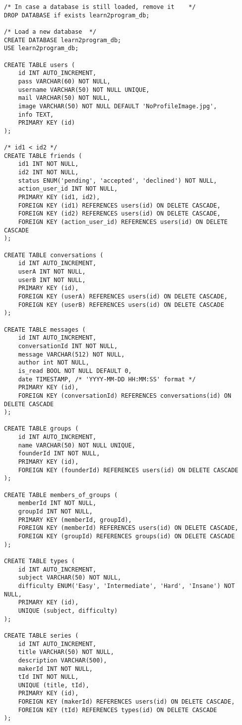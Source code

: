 \begin{lstlisting}    
/* In case a database is still loaded, remove it    */
DROP DATABASE if exists learn2program_db;

/* Load a new database  */
CREATE DATABASE learn2program_db;
USE learn2program_db;

CREATE TABLE users (
    id INT AUTO_INCREMENT,
    pass VARCHAR(60) NOT NULL,
    username VARCHAR(50) NOT NULL UNIQUE,
    mail VARCHAR(50) NOT NULL,
    image VARCHAR(50) NOT NULL DEFAULT 'NoProfileImage.jpg', 
    info TEXT,
    PRIMARY KEY (id)
);

/* id1 < id2 */
CREATE TABLE friends (
    id1 INT NOT NULL,
    id2 INT NOT NULL,
    status ENUM('pending', 'accepted', 'declined') NOT NULL,
    action_user_id INT NOT NULL,
    PRIMARY KEY (id1, id2),
    FOREIGN KEY (id1) REFERENCES users(id) ON DELETE CASCADE,
    FOREIGN KEY (id2) REFERENCES users(id) ON DELETE CASCADE,
    FOREIGN KEY (action_user_id) REFERENCES users(id) ON DELETE CASCADE
);

CREATE TABLE conversations (
    id INT AUTO_INCREMENT,
    userA INT NOT NULL,
    userB INT NOT NULL,
    PRIMARY KEY (id),
    FOREIGN KEY (userA) REFERENCES users(id) ON DELETE CASCADE,
    FOREIGN KEY (userB) REFERENCES users(id) ON DELETE CASCADE
);

CREATE TABLE messages (
    id INT AUTO_INCREMENT,
    conversationId INT NOT NULL,
    message VARCHAR(512) NOT NULL,
    author int NOT NULL,
    is_read BOOL NOT NULL DEFAULT 0,
    date TIMESTAMP, /* 'YYYY-MM-DD HH:MM:SS' format */
    PRIMARY KEY (id),
    FOREIGN KEY (conversationId) REFERENCES conversations(id) ON DELETE CASCADE
);

CREATE TABLE groups (
    id INT AUTO_INCREMENT,
    name VARCHAR(50) NOT NULL UNIQUE,
    founderId INT NOT NULL,
    PRIMARY KEY (id),
    FOREIGN KEY (founderId) REFERENCES users(id) ON DELETE CASCADE
);

CREATE TABLE members_of_groups (
    memberId INT NOT NULL,
    groupId INT NOT NULL,
    PRIMARY KEY (memberId, groupId),
    FOREIGN KEY (memberId) REFERENCES users(id) ON DELETE CASCADE,
    FOREIGN KEY (groupId) REFERENCES groups(id) ON DELETE CASCADE
);

CREATE TABLE types (
    id INT AUTO_INCREMENT,
    subject VARCHAR(50) NOT NULL,
    difficulty ENUM('Easy', 'Intermediate', 'Hard', 'Insane') NOT NULL,
    PRIMARY KEY (id),
    UNIQUE (subject, difficulty)
);

CREATE TABLE series (
    id INT AUTO_INCREMENT,
    title VARCHAR(50) NOT NULL,
    description VARCHAR(500),
    makerId INT NOT NULL,
    tId INT NOT NULL,
    UNIQUE (title, tId),
    PRIMARY KEY (id),
    FOREIGN KEY (makerId) REFERENCES users(id) ON DELETE CASCADE,
    FOREIGN KEY (tId) REFERENCES types(id) ON DELETE CASCADE
);


\end{lstlisting}
